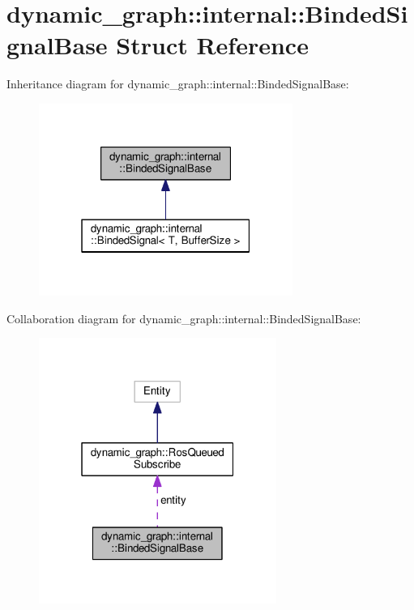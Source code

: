\hypertarget{structdynamic__graph_1_1internal_1_1BindedSignalBase}{}\section{dynamic\+\_\+graph\+:\+:internal\+:\+:Binded\+Signal\+Base Struct Reference}
\label{structdynamic__graph_1_1internal_1_1BindedSignalBase}


Inheritance diagram for dynamic\+\_\+graph\+:\+:internal\+:\+:Binded\+Signal\+Base\+:
\nopagebreak
\begin{figure}[H]
\begin{center}
\leavevmode
\includegraphics[width=235pt]{structdynamic__graph_1_1internal_1_1BindedSignalBase__inherit__graph}
\end{center}
\end{figure}


Collaboration diagram for dynamic\+\_\+graph\+:\+:internal\+:\+:Binded\+Signal\+Base\+:
\nopagebreak
\begin{figure}[H]
\begin{center}
\leavevmode
\includegraphics[width=220pt]{structdynamic__graph_1_1internal_1_1BindedSignalBase__coll__graph}
\end{center}
\end{figure}
